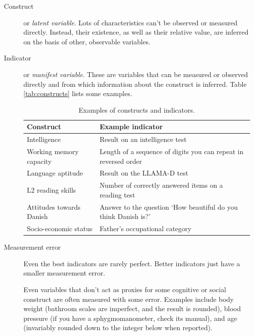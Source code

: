 \documentclass[a4paper]{tufte-book}\usepackage[]{graphicx}\usepackage[]{xcolor}
\begin{document}
\begin{description}
  \item[Construct] or \textit{latent variable}. 
  Lots of characteristics can't be observed or measured directly.
  Instead, their existence, as well as their relative value, are
  inferred on the basis of other, observable variables.
  
  \item[Indicator] or \textit{manifest variable}. 
  These are variables that can be measured or observed directly
  and from which information about the construct is inferred.
  Table \vref{tab:constructs} lists some examples.
  
\begin{table}
\centering
\begin{tabular}{p{4.75cm}p{5cm}}
  \toprule
  Construct                               &   Example indicator \\
  \midrule  
  Intelligence                            &   Result on an intelligence test\\
  Working memory capacity                 &   Length of a sequence of digits you can repeat in reversed order\\
  Language aptitude                       &   Result on the LLAMA-D test\\
  L2 reading skills                       &   Number of correctly answered items on a reading test\\
  Attitudes towards Danish                &   Answer to the question `How beautiful do you think Danish is?'\\
  Socio-economic status                   &   Father's occupational category\\
  \bottomrule
\end{tabular}
\caption{Examples of constructs and indicators.}
\label{tab:constructs}
\end{table}

  \item[Measurement error] Even the best indicators are rarely perfect.
  Better indicators just have a smaller measurement error.
  
  Even variables that don't act as proxies for some cognitive or social
  construct are often measured with some error. Examples include
  body weight (bathroom scales are imperfect, and the result is rounded),
  blood pressure (if you have a sphygmomanometer, 
  check its manual),
  and age (invariably rounded down to the integer below when reported).
\end{description}
\end{document}
